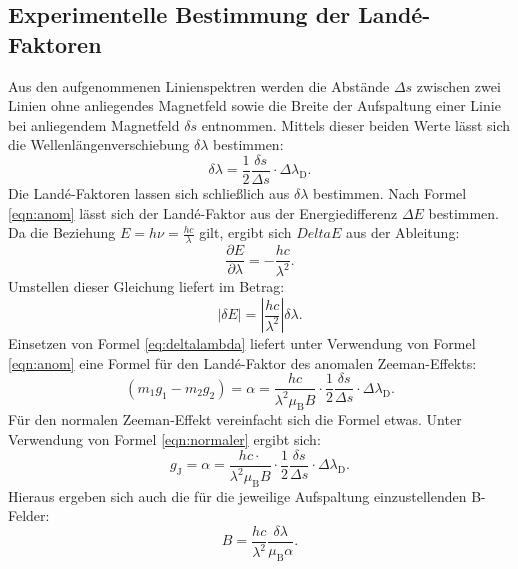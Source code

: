 \subsection{Experimentelle Bestimmung der Landé-Faktoren}
Aus den aufgenommenen Linienspektren werden die Abstände $\Delta s$ zwischen zwei Linien ohne anliegendes Magnetfeld sowie die Breite der Aufspaltung einer Linie bei anliegendem Magnetfeld $\delta s$ entnommen.
Mittels dieser beiden Werte lässt sich die Wellenlängenverschiebung $\delta \lambda$ bestimmen:
\begin{equation}
  \label{eq:deltalambda}
  \delta \lambda = \frac{1}{2} \frac{\delta s}{\Delta s}\cdot \Delta \lambda_{\mathrm{D}}\mathrm{.}
\end{equation}
Die Landé-Faktoren lassen sich schließlich aus $\delta \lambda$ bestimmen.
Nach Formel \eqref{eqn:anom} lässt sich der Landé-Faktor aus der Energiedifferenz $\Delta E$ bestimmen. Da die Beziehung $E=h \nu=\frac{hc}{\lambda}$ gilt, ergibt sich $Delta E$ aus der Ableitung:
\begin{equation}
  \frac{\partial E}{\partial \lambda} = -\frac{hc}{\lambda^2}\mathrm{.}
\end{equation}
Umstellen dieser Gleichung liefert im Betrag:
\begin{equation}
 | \delta E | = \left| \frac{hc}{\lambda^2} \right| \delta \lambda\mathrm{.}
\end{equation}
Einsetzen von Formel \eqref{eq:deltalambda} liefert unter Verwendung von Formel \eqref{eqn:anom} eine Formel für den Landé-Faktor des anomalen Zeeman-Effekts:
\begin{equation}
  \label{eqn:g_exp}
   \left(m_1g_1-m_2g_2\right)=\alpha= \frac{hc}{\lambda^2\mu_{\mathrm{B}}B}\cdot \frac{1}{2} \frac{\delta s}{\Delta s}\cdot \Delta \lambda_{\mathrm{D}}\mathrm{.}
\end{equation}
Für den normalen Zeeman-Effekt vereinfacht sich die Formel etwas. Unter Verwendung von Formel \eqref{eqn:normaler} ergibt sich:
\begin{equation}
  \label{eqn:g_exp}
   g_{\mathrm{J}}=\alpha= \frac{hc\cdot}{\lambda^2\mu_{\mathrm{B}}B}\cdot \frac{1}{2} \frac{\delta s}{\Delta s}\cdot \Delta \lambda_{\mathrm{D}}\mathrm{.}
\end{equation}
Hieraus ergeben sich auch die für die jeweilige Aufspaltung einzustellenden B-Felder:
\begin{equation}
  \label{eqn:b-feld}
  B=\frac{hc}{\lambda^2} \frac{\delta \lambda}{\mu_{\mathrm{B}}\alpha}\mathrm{.}
\end{equation}
